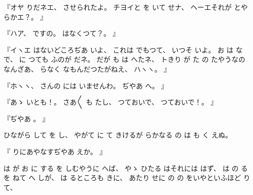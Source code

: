 %
『オヤ
りだネエ、
%
させられたよ。
%
チヨイと
を
いて
せナ、
%
ヘーエそれが
とやらかエ？。
』

%
『ハア、
%
ですの。
%
はなくつて？。
』

%
『イヽエ
はないどころぢあ
いよ、
%
これは
でもつて、
%
いつそ
いよ。
%
お
は
な
で、
%
に
つても
ふのが
だネ。
%
だが
も
は
へたネ、
%
トきり
が
た
の
たやうなのなんざあ、
%
らなく
なもんだつたがねえ、
%
ハヽヽ。
』

%
『ホヽヽ、
%
さんの
には
いませんわ。
%
ぢやあ
へ。
』

%
『あゝ
いとも！。
%
さあ〳〵
も
たし、
%
つておいで、
%
つておいで！。
』

%
『ぢやあ
。
』

%
ひながら
して
を
し、
%
やがて
に
て
きけるが
らかなる
の
は
も
く
えぬ。

%
『
りにあやなすぢやあ
えか。
』

%
は
が
お
に
する
を
しむやうに
へば、
%
やゝ
ひたる%
はそれには
はず、
%
は
の
る
を
ねて
へ
しが、
%
は
るところも%
きに、
%
あたり
せに
の
の
をいやといふほど
りて、

